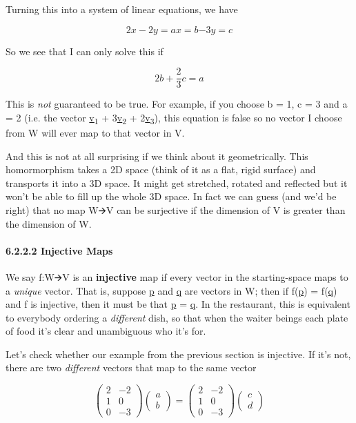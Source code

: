 \documentclass[oneside,english]{amsbook}
\numberwithin{section}{chapter}
\theoremstyle{plain}
\theoremstyle{definition}
\begin{document}
Turning this into a system of linear equations, we have

\[{2x - 2y = a
}{x = b
}{- 3y = c}\]

So we see that I can only solve this if

\[2b + \frac{2}{3}c = a\]

This is \emph{not} guaranteed to be true. For example, if you choose b =
1, c = 3 and a = 2 (i.e. the vector \ul{v}\textsubscript{1} +
3\ul{v}\textsubscript{2} + 2\ul{v}\textsubscript{3}), this equation is
false so no vector I choose from W will ever map to that vector in V.

And this is not at all surprising if we think about it geometrically.
This homormorphism takes a 2D space (think of it as a flat, rigid
surface) and transports it into a 3D space. It might get stretched,
rotated and reflected but it won't be able to fill up the whole 3D
space. In fact we can guess (and we'd be right) that no map W🡪V can be
surjective if the dimension of V is greater than the dimension of W.

\paragraph{6.2.2.2 Injective Maps}\label{injective-maps}

We say f:W🡪V is an \textbf{injective} map if every vector in the
starting-space maps to a \emph{unique} vector. That is, suppose \ul{p}
and \ul{q} are vectors in W; then if f(\ul{p}) = f(\ul{q}) and f is
injective, then it must be that \ul{p} = \ul{q}. In the restaurant, this
is equivalent to everybody ordering a \emph{different} dish, so that
when the waiter beings each plate of food it's clear and unambiguous who
it's for.

Let's check whether our example from the previous section is injective.
If it's not, there are two \emph{different} vectors that map to the same
vector

\[\begin{pmatrix}
	2 & - 2 \\
	1 & 0 \\
	0 & - 3
\end{pmatrix}\begin{pmatrix}
	a \\
	b
\end{pmatrix} = \begin{pmatrix}
	2 & - 2 \\
	1 & 0 \\
	0 & - 3
\end{pmatrix}\begin{pmatrix}
	c \\
	d
\end{pmatrix}\]
\end{document}
